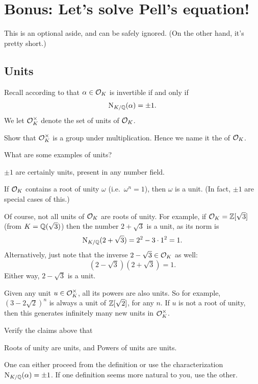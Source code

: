 \chapter{Bonus: Let's solve Pell's equation!}
\label{ch:pells_equation}
This is an optional aside, and can be safely ignored.
(On the other hand, it's pretty short.)

\section{Units}
Recall according to  that $\alpha \in \mathcal O_K$ is invertible
if and only if \[ \operatorname{N}_{K/\mathbb Q}(\alpha) = \pm 1. \]
We let $\mathcal O_K^\times$ denote the set of units of $\mathcal O_K$.

\begin{ques}
	Show that $\mathcal O_K^\times$ is a group under multiplication.
	Hence we name it the  of $\mathcal O_K$.
\end{ques}

What are some examples of units?
\begin{example}
	\listhack
	\begin{enumerate}
		\ii $\pm 1$ are certainly units, present in any number field.

		\ii If $\mathcal O_K$ contains a root of unity $\omega$ (i.e.\ $\omega^n=1$),
		then $\omega$ is a unit.
		(In fact, $\pm 1$ are special cases of this.)

		\ii Of course, not all units of $\mathcal O_K$ are roots of unity.
		For example, if $\mathcal O_K = \mathbb Z[\sqrt3]$ (from $K = \mathbb Q(\sqrt3)$) then
		the number $2+\sqrt3$ is a unit, as its norm is
		\[ \operatorname{N}_{K/\mathbb Q}(2+\sqrt3) = 2^2 - 3 \cdot 1^2 = 1. \]
		Alternatively, just note that the inverse $2-\sqrt3 \in \mathcal O_K$ as well:
		\[ \left( 2-\sqrt3 \right)\left( 2+\sqrt3 \right) = 1. \]
		Either way, $2-\sqrt3$ is a unit.

		\ii Given any unit $u \in \mathcal O_K^\times$, all its powers are also units.
		So for example, $(3-2\sqrt2)^n$ is always a unit of $\mathbb Z[\sqrt2]$, for any $n$.
		If $u$ is not a root of unity, then this generates infinitely many new units in $\mathcal O_K^\times$.
	\end{enumerate}
\end{example}

\begin{ques}
	Verify the claims above that
	\begin{enumerate}[(a)]
		\ii Roots of unity are units, and
		\ii Powers of units are units.
	\end{enumerate}
	One can either proceed from the definition
	or use the characterization $\operatorname{N}_{K/\mathbb Q}(\alpha) = \pm 1$.
	If one definition seems more natural to you, use the other.
\end{ques}

